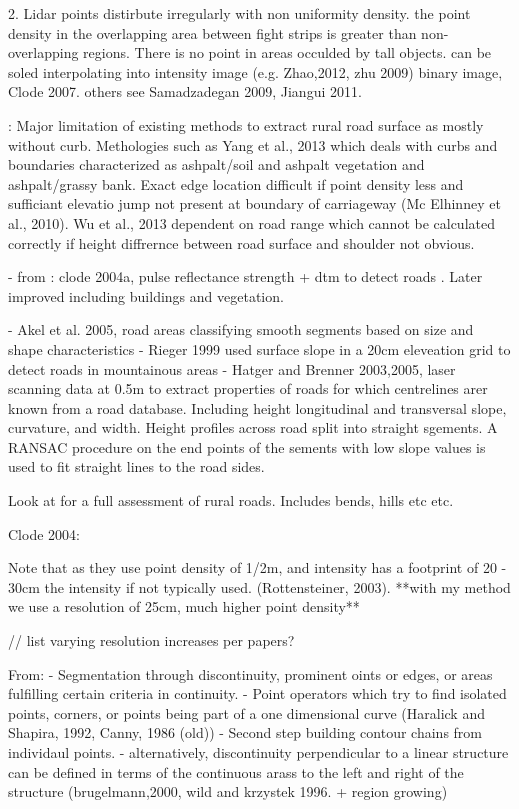 \begin{multicols}{2}
2. Lidar points distirbute irregularly with non uniformity density. the point density in the overlapping area between fight strips is greater than non-overlapping regions. There is no point in areas occulded by tall objects. can be soled interpolating into intensity image (e.g. Zhao,2012, zhu 2009) binary image, Clode 2007. others see Samadzadegan 2009, Jiangui 2011.

\citep{yadav2018}: Major limitation of existing methods to extract rural road surface as mostly without curb. Methologies such as Yang et al., 2013 which deals with curbs and boundaries characterized as ashpalt/soil and ashpalt vegetation and ashpalt/grassy bank. Exact edge location difficult if point density less and sufficiant elevatio jump not present at boundary of carriageway (Mc Elhinney et al., 2010). Wu et al., 2013 dependent on road range which cannot be calculated correctly if height diffrernce between road surface and shoulder not obvious.



- from \citep{vosselman2009a}: clode 2004a, pulse reflectance strength + dtm to detect roads . Later improved including buildings and vegetation.

- Akel et al. 2005, road areas classifying smooth segments based on size and shape characteristics
- Rieger 1999 used surface slope in a 20cm eleveation grid to detect roads in mountainous areas
- Hatger and Brenner 2003,2005, laser scanning data at 0.5m to extract properties of roads for which centrelines arer known from a road database. Including height longitudinal and transversal slope, curvature, and width. Height profiles across road split into straight sgements. A RANSAC procedure on the end points of the sements with low slope values is used to fit straight lines to the road sides. \citep{hatger2003;hatger2005}

Look at \citep{taylor2002} for a full assessment of rural roads. Includes bends, hills etc etc.

Clode 2004:

Note that as they use point density of 1/2m, and intensity has a footprint of 20 - 30cm the intensity if not typically used. (Rottensteiner, 2003). **with my method we use a resolution of 25cm, much higher point density**


// list varying resolution increases per papers?

From: \citep{hatger2005}
- Segmentation through discontinuity, prominent oints or edges, or areas fulfilling certain criteria in continuity.
- Point operators which try to find isolated points, corners, or points being part of a one dimensional curve (Haralick and Shapira, 1992, Canny, 1986 (old))
- Second step building contour chains from individaul points.
- alternatively, discontinuity perpendicular to a linear structure can be defined in terms of the continuous arass to the left and right of the structure (brugelmann,2000, wild and krzystek 1996. + region growing)


\end{multicols}
